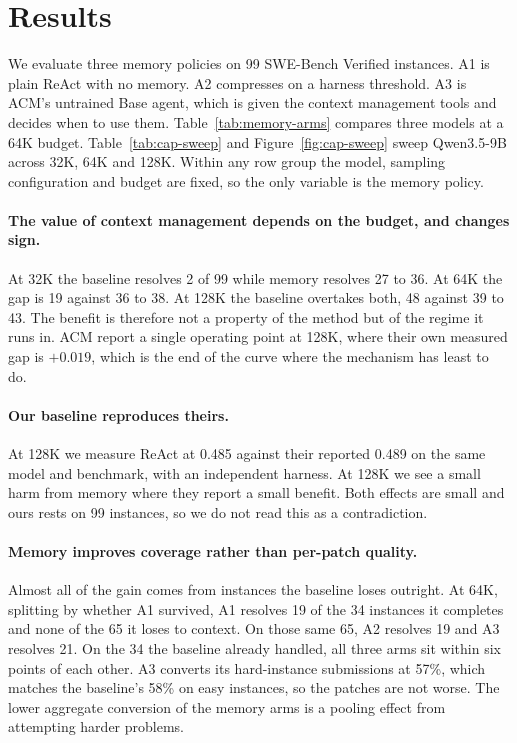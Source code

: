 \section{Results}

We evaluate three memory policies on 99 SWE-Bench Verified instances. A1 is plain
ReAct with no memory. A2 compresses on a harness threshold. A3 is ACM's untrained
Base agent, which is given the context management tools and decides when to use
them. Table~\ref{tab:memory-arms} compares three models at a 64K budget.
Table~\ref{tab:cap-sweep} and Figure~\ref{fig:cap-sweep} sweep Qwen3.5-9B across
32K, 64K and 128K. Within any row group the model, sampling configuration and
budget are fixed, so the only variable is the memory policy.

\paragraph{The value of context management depends on the budget, and changes sign.}
At 32K the baseline resolves 2 of 99 while memory resolves 27 to 36. At 64K the
gap is 19 against 36 to 38. At 128K the baseline overtakes both, 48 against 39 to
43. The benefit is therefore not a property of the method but of the regime it
runs in. ACM report a single operating point at 128K, where their own measured
gap is $+0.019$, which is the end of the curve where the mechanism has least to do.

\paragraph{Our baseline reproduces theirs.}
At 128K we measure ReAct at 0.485 against their reported 0.489 on the same model
and benchmark, with an independent harness. At 128K we see a small harm from
memory where they report a small benefit. Both effects are small and ours rests
on 99 instances, so we do not read this as a contradiction.

\paragraph{Memory improves coverage rather than per-patch quality.}
Almost all of the gain comes from instances the baseline loses outright. At 64K,
splitting by whether A1 survived, A1 resolves 19 of the 34 instances it completes
and none of the 65 it loses to context. On those same 65, A2 resolves 19 and A3
resolves 21. On the 34 the baseline already handled, all three arms sit within six
points of each other. A3 converts its hard-instance submissions at 57\%, which
matches the baseline's 58\% on easy instances, so the patches are not worse. The
lower aggregate conversion of the memory arms is a pooling effect from attempting
harder problems.

